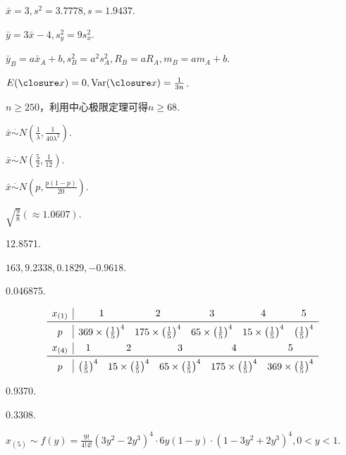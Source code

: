 \setcounter{section}{2}

\begin{answer}
  \item $\bar x=3,s^2=3.7778,s=1.9437$.
  \setcounter{enumi}{2}
  \item $\bar y=3\bar x-4,s_y^2=9s_x^2$.
  \setcounter{enumi}{5}
  \item $\bar y_B=a\bar x_A+b,s_B^2=a^2s_A^2,R_B=aR_A,m_B=am_A+b$.
  \setcounter{enumi}{7}
  \item $E(\bar x)=0,\Var(\bar x)=\frac1{3n}$.
  \setcounter{enumi}{9}
  \item $n\ge250$，利用中心极限定理可得$n\ge68$.
  \item $\bar x\overset{\cdot}{\sim}N\left(\frac1\lambda,
      \frac1{40\lambda^2}\right)$.
  \item $\bar x\overset{\cdot}{\sim}N\left(\frac52,\frac1{12}\right)$.
  \item $\bar x\overset{\cdot}{\sim}N\left(p,\frac{p(1-p)}{20}\right)$.
  \item $\sqrt{\frac98}(\approx1.0607)$.
  \item 12.8571.
  \item $163,9.2338,0.1829,-0.9618$.
  \item 0.046875.
  \item
    \begin{gather*}
      \begin{array}{c|ccccc}
        x_{(1)} & 1 & 2 & 3 & 4 & 5 \\
        \midrule
        p & 369\times \left(\frac15\right)^4 & 175\times \left(\frac15\right)^4 & 65 \times \left(\frac15\right)^4 & 15 \times \left(\frac15\right)^4 & \left(\frac15\right)^4
      \end{array}\\
      \begin{array}{c|ccccc}
        x_{(4)} & 1 & 2 & 3 & 4 & 5 \\
        \midrule
        p & \left(\frac15\right)^4 & 15\times \left(\frac15\right)^4 & 65 \times \left(\frac15\right)^4 & 175 \times \left(\frac15\right)^4 & 369 \times \left(\frac15\right)^4
      \end{array}
    \end{gather*}
    \item \begin{enumerate*}
      \item 0.9370.
      \item 0.3308.
    \end{enumerate*}
    \item $x_{(5)}\sim f(y)=\frac{9!}{4!4!}(3y^2-2y^3)^4\cdot 6y(1-y)\cdot(1-3y^2+2y^3)^4,0<y<1$.
\end{answer}

